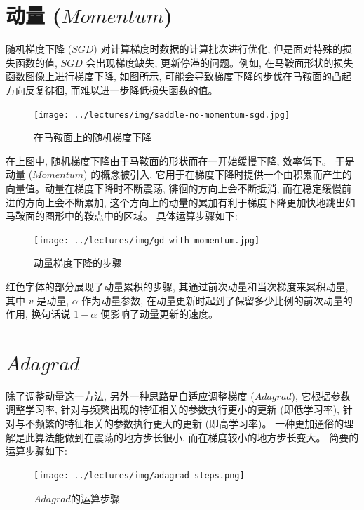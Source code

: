 \documentclass[printMode=false, declarePage=false]{ecnuthesis}
\begin{document}
    \section{动量 ($Momentum$)}

    随机梯度下降 ($SGD$) 对计算梯度时数据的计算批次进行优化, 但是面对特殊的损失函数的值, $SGD$ 会出现梯度缺失, 更新停滞的问题。例如, 在马鞍面形状的损失函数图像上进行梯度下降, 如图所示, 可能会导致梯度下降的步伐在马鞍面的凸起方向反复徘徊, 而难以进一步降低损失函数的值。

    \begin{figure}[H]
        \centering
        \texttt{[image: ../lectures/img/saddle-no-momentum-sgd.jpg]}
        \caption{在马鞍面上的随机梯度下降}
    \end{figure}

    在上图中, 随机梯度下降由于马鞍面的形状而在一开始缓慢下降, 效率低下。
    于是动量 ($Momentum$) 的概念被引入, 它用于在梯度下降时提供一个由积累而产生的向量值。动量在梯度下降时不断震荡, 徘徊的方向上会不断抵消, 而在稳定缓慢前进的方向上会不断累加, 这个方向上的动量的累加有利于梯度下降更加快地跳出如马鞍面的图形中的鞍点中的区域。
    具体运算步骤如下:

    \begin{figure}[H]
        \centering
        \texttt{[image: ../lectures/img/gd-with-momentum.jpg]}
        \caption{动量梯度下降的步骤}
    \end{figure}

    红色字体的部分展现了动量累积的步骤, 其通过前次动量和当次梯度来累积动量, 其中 \( v \) 是动量, \( \alpha \) 作为动量参数, 在动量更新时起到了保留多少比例的前次动量的作用, 换句话说 \( 1 - \alpha \) 便影响了动量更新的速度。

    \section{$Adagrad$}

    除了调整动量这一方法, 另外一种思路是自适应调整梯度 ($Adagrad$), 
    它根据参数调整学习率, 针对与频繁出现的特征相关的参数执行更小的更新 (即低学习率), \cite{ward2020adagrad}
    针对与不频繁的特征相关的参数执行更大的更新 (即高学习率)。
    一种更加通俗的理解是此算法能做到在震荡的地方步长很小, 而在梯度较小的地方步长变大。\cite{antonakopoulos2022adagrad}
    简要的运算步骤如下:

    \begin{figure}[H]
        \centering
        \texttt{[image: ../lectures/img/adagrad-steps.png]}
        \caption{$Adagrad$的运算步骤}
    \end{figure}
\end{document}
